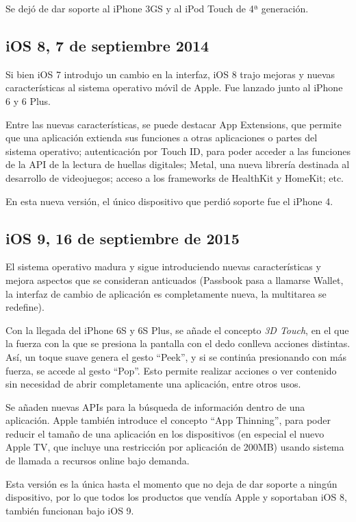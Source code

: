 Se dejó de dar soporte al iPhone 3GS y al iPod Touch de 4ª generación.

\subsection{iOS 8, 7 de septiembre 2014}
Si bien iOS 7 introdujo un cambio en la interfaz, iOS 8 trajo mejoras y nuevas características al sistema operativo móvil de Apple. Fue lanzado junto al iPhone 6 y 6 Plus.

Entre las nuevas características, se puede destacar App Extensions, que permite que una aplicación extienda sus funciones a otras aplicaciones o partes del sistema operativo; autenticación por Touch ID, para poder acceder a las funciones de la API de la lectura de huellas digitales; Metal, una nueva librería destinada al desarrollo de videojuegos; acceso a los frameworks de HealthKit y HomeKit; etc.

En esta nueva versión, el único dispositivo que perdió soporte fue el iPhone 4.

\subsection{iOS 9, 16 de septiembre de 2015}
El sistema operativo madura y sigue introduciendo nuevas características y mejora aspectos que se consideran anticuados (Passbook pasa a llamarse Wallet, la interfaz de cambio de aplicación es completamente nueva, la multitarea se redefine).

Con la llegada del iPhone 6S y 6S Plus, se añade el concepto \textit{3D Touch}, en el que la fuerza con la que se presiona la pantalla con el dedo conlleva acciones distintas. Así, un toque suave genera el gesto ``Peek'', y si se continúa presionando con más fuerza, se accede al gesto ``Pop''. Esto permite realizar acciones o ver contenido sin necesidad de abrir completamente una aplicación, entre otros usos.

Se añaden nuevas APIs para la búsqueda de información dentro de una aplicación. Apple también introduce el concepto ``App Thinning'', para poder reducir el tamaño de una aplicación en los dispositivos (en especial el nuevo Apple TV, que incluye una restricción por aplicación de 200MB) usando sistema de llamada a recursos online bajo demanda.

Esta versión es la única hasta el momento que no deja de dar soporte a ningún dispositivo, por lo que todos los productos que vendía Apple y soportaban iOS 8, también funcionan bajo iOS 9.


